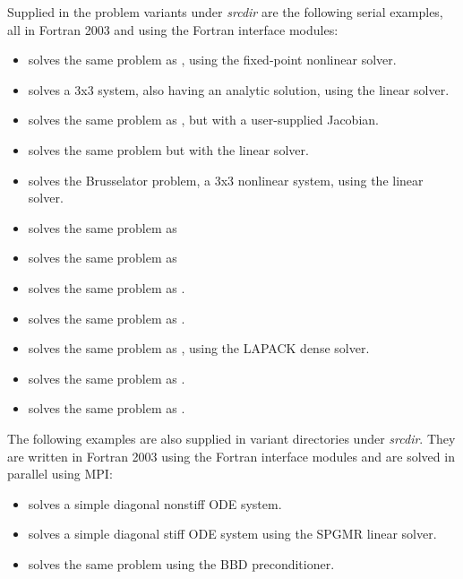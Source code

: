 \vspace{0.2in}\noindent Supplied in the problem variants under
{\em srcdir} are the following serial examples,
all in Fortran 2003 and using the {\sundials} Fortran interface modules:
\begin{itemize}
\item {} solves the same problem as
  , using the fixed-point nonlinear solver.
\item {} solves a 3x3 system, also
  having an analytic solution, using the {\sunlinsoldense} linear solver.
\item {} solves the same problem as
  , but with a user-supplied Jacobian.
\item {} solves the same problem but
  with the {\sunlinsolklu} linear solver.
\item {} solves the Brusselator problem,
  a 3x3 nonlinear system, using the {\sunlinsoldense} linear solver.
\item {} solves the same problem as
\item {} solves the same problem as
\item {} solves the same problem as
  .
\item {} solves the same problem as
  .
\item {} solves the same problem as
  , using the LAPACK dense solver.
\item {} solves the same problem as
  .
\item {} solves the same problem as
  .
\end{itemize}

\vspace{0.2in}\noindent The following examples are also supplied in variant
directories under {\em srcdir}. They are written
in Fortran 2003 using the {\sundials} Fortran interface modules and are solved
in parallel using MPI:
\begin{itemize}
\item {} solves a simple diagonal nonstiff
  ODE system.
\item {} solves a simple diagonal stiff
  ODE system using the SPGMR linear solver.
\item {} solves the same problem
  using the BBD preconditioner.
\end{itemize}

